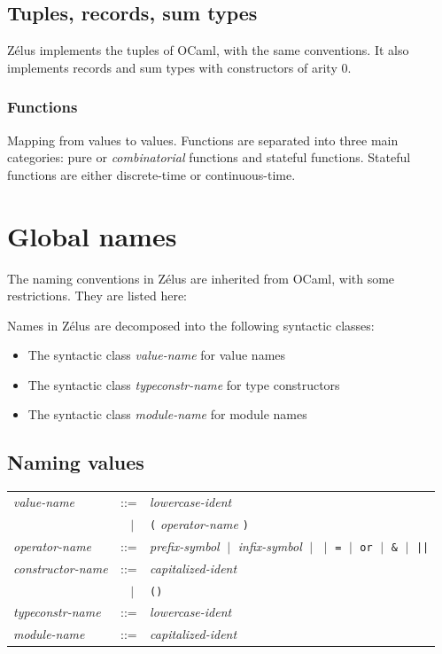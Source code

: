 \documentclass[11pt,titlepage,twoside]{report}
\newcommand{\zelus}{{\sf Z\'elus}}
\newcommand{\ocaml}{{\sf OCaml}}
\newcommand{\alt}{\;|\;}
\newcommand{\term}[1]{{\tt #1}}
\newcommand{\nterm}[1]{{\em #1}}
\begin{document}
\subsection{Tuples, records, sum types}
\zelus{} implements the tuples of \ocaml, with the same conventions. It
also implements records and sum types with constructors of arity 0.

\subsubsection{Functions}
Mapping from values to values. Functions are separated into three main
categories: pure or \emph{combinatorial} functions and stateful functions. Stateful
functions are either discrete-time or continuous-time.

\section{Global names}
\label{global-names}
The naming conventions in \zelus{} are inherited from \ocaml, with some
restrictions. They are listed here:

Names in \zelus{} are decomposed into the following syntactic classes:
\begin{itemize}
\item
  The syntactic class \nterm{value-name} for value names
\item
  The syntactic class \nterm{typeconstr-name} for type constructors
\item
  The syntactic class \nterm{module-name} for module names
\end{itemize}

\subsection{Naming values}

\begin{center}
\begin{tabular}{lcl}
\nterm{value-name}       & ::=    & \nterm{lowercase-ident} \\
                         & $\;\;\alt$ & \term{(} \nterm{operator-name}
                                        \term{)} \\
\nterm{operator-name}    & ::=    & \nterm{prefix-symbol} 
                           $\alt$   \nterm{infix-symbol} 
                           $\alt$   \term{*} $\alt$ \term{=} $\alt$ \term{or}
                           $\alt$   \term{\&} $\alt$ \term{||} \\
\nterm{constructor-name} & ::=    & \nterm{capitalized-ident} \\
                         & $\;\;\alt$ & \term{()} \\
\nterm{typeconstr-name}  & ::=    & \nterm{lowercase-ident} \\
\nterm{module-name}      & ::=    & \nterm{capitalized-ident}
\end{tabular}
\end{center}
\end{document}
